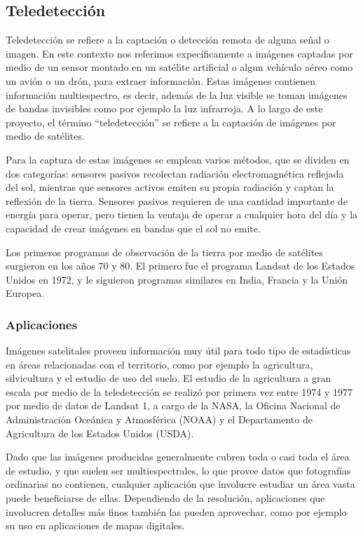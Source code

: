 \subsection{Teledetección}

Teledetección se refiere a la captación o detección remota de alguna señal o imagen. En este contexto nos referimos
expecíficamente a imágenes captadas por medio de un sensor montado en un satélite artificial o algun vehículo aéreo
como un avión o un drón, para extraer información. Estas imágenes contienen información multiespectro, es decir, además
de la luz visible se toman imágenes de bandas invisibles como por ejemplo la luz infrarroja.
\autocite{globalforestlink-how-sat-imaging-work} A lo largo de este proyecto, el término \enquote{teledetección} se
refiere a la captación de imágenes por medio de satélites.

Para la captura de estas imágenes se emplean varios métodos, que se dividen en dos categorías: sensores pasivos
recolectan radiación electromagnética reflejada del sol, mientras que sensores activos emiten su propia radiación y
captan la reflexión de la tierra. Sensores pasivos requieren de una cantidad importante de energía para operar, pero
tienen la ventaja de operar a cualquier hora del día y la capacidad de crear imágenes en bandas que el sol no emite.
\autocite{globalforestlink-how-sat-imaging-work}

Los primeros programas de observación de la tierra por medio de satélites surgieron en los años 70 y 80. El primero fue
el programa Landsat de los Estados Unidos en 1972, y le siguieron programas similares en India, Francia y la Unión
Europea. \autocite{esa-space-year-2007}

\subsubsection{Aplicaciones}

Imágenes satelitales proveen información muy útil para todo tipo de estadísticas en áreas relacionadas con el
territorio, como por ejemplo la agricultura, silvicultura y el estudio de uso del suelo. El estudio de la agricultura a
gran escala por medio de la teledetección se realizó por primera vez entre 1974 y 1977 por medio de datos de Landsat 1,
a cargo de la NASA, la Oficina Nacional de Administración Oceánica y Atmosférica (NOAA) y el Departamento de
Agricultura de los Estados Unidos (USDA). \autocite{allen-usda-study}

Dado que las imágenes producidas generalmente cubren toda o casi toda el área de estudio, y que suelen ser
multiespectrales, lo que provee datos que fotografías ordinarias no contienen, cualquier aplicación que involucre
estudiar un área vasta puede beneficiarse de ellas. Dependiendo de la resolución, aplicaciones que involucren detalles
más finos también las pueden aprovechar, como por ejemplo su uso en aplicaciones de mapas digitales.

